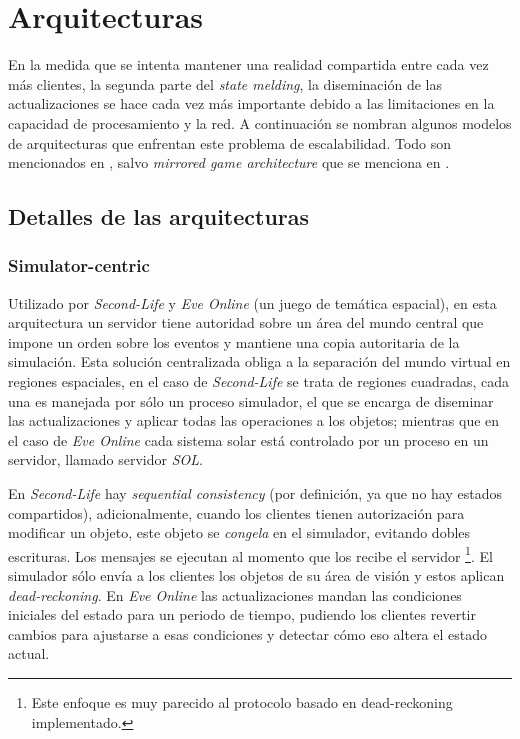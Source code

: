 \section{Arquitecturas}

En la medida que se intenta mantener una realidad compartida entre cada vez más clientes, la segunda parte del \emph{state melding}, la diseminación de las actualizaciones se hace cada vez más importante debido a las limitaciones en la capacidad de procesamiento y la red. A continuación se nombran algunos modelos de arquitecturas que enfrentan este problema de escalabilidad. Todo son mencionados en \cite{liu2012survey}, salvo \emph{mirrored game architecture} que se menciona en \cite{cronin2004efficient}.

\subsection{Detalles de las arquitecturas}

\subsubsection{Simulator-centric}

Utilizado por \emph{Second-Life} y \emph{Eve Online} (un juego de temática espacial), en esta arquitectura un servidor tiene autoridad sobre un área del mundo central que impone un orden sobre los eventos y mantiene una copia autoritaria de la simulación. Esta solución centralizada obliga a la separación del mundo virtual en regiones espaciales, en el caso de \emph{Second-Life} se trata de regiones cuadradas, cada una es manejada por sólo un proceso simulador, el que se encarga de diseminar las actualizaciones y aplicar todas las operaciones a los objetos; mientras que en el caso de \emph{Eve Online} cada sistema solar está controlado por un proceso en un servidor, llamado servidor \emph{SOL}.

En \emph{Second-Life} hay \emph{sequential consistency} (por definición, ya que no hay estados compartidos), adicionalmente, cuando los clientes tienen autorización para modificar un objeto, este objeto se \emph{congela} en el simulador, evitando dobles escrituras. Los mensajes se ejecutan al momento que los recibe el servidor \footnote{Este enfoque es muy parecido al protocolo basado en dead-reckoning implementado.}. El simulador sólo envía a los clientes los objetos de su área de visión y estos aplican \emph{dead-reckoning}. En \emph{Eve Online} las actualizaciones mandan las condiciones iniciales del estado para un periodo de tiempo, pudiendo los clientes revertir cambios para ajustarse a esas condiciones y detectar cómo eso altera el estado actual.

